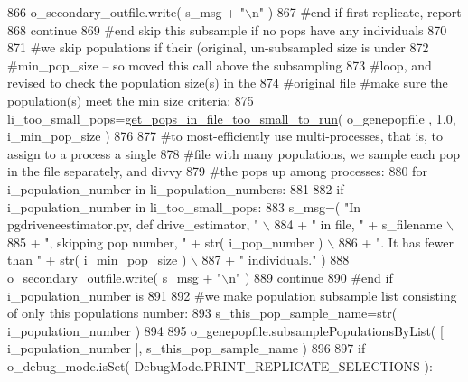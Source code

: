 \begin{DoxyCode}
866                 o\_secondary\_outfile.write( s\_msg + \textcolor{stringliteral}{"\(\backslash\)n"} )
867             \textcolor{comment}{#end if first replicate, report}
868             \textcolor{keywordflow}{continue}
869         \textcolor{comment}{#end skip this subsample if no pops have any individuals}
870 
871         \textcolor{comment}{#we skip populations if their (original, un-subsampled size is under }
872         \textcolor{comment}{#min\_pop\_size -- so moved this call above the subsampling}
873         \textcolor{comment}{#loop, and revised to check the population size(s) in the}
874         \textcolor{comment}{#original file #make sure the population(s) meet the min size criteria:}
875         li\_too\_small\_pops=\hyperlink{namespacenegui_1_1pgdriveneestimator_a8255cfe046e2bbb517ee9834d626c021}{get\_pops\_in\_file\_too\_small\_to\_run}( o\_genepopfile
      , 1.0, i\_min\_pop\_size )
876 
877         \textcolor{comment}{#to most-efficiently use multi-processes, that is, to assign to a process a single}
878         \textcolor{comment}{#file with many populations, we sample each pop in the file separately, and divvy}
879         \textcolor{comment}{#the pops up among processes:}
880         \textcolor{keywordflow}{for} i\_population\_number \textcolor{keywordflow}{in} li\_population\_numbers:
881 
882             \textcolor{keywordflow}{if} i\_population\_number \textcolor{keywordflow}{in} li\_too\_small\_pops:
883                 s\_msg=( \textcolor{stringliteral}{"In pgdriveneestimator.py, def drive\_estimator, "} \(\backslash\)
884                                 + \textcolor{stringliteral}{" in file, "}  + s\_filename \(\backslash\)
885                                 + \textcolor{stringliteral}{", skipping pop number, "}  + str( i\_pop\_number ) \(\backslash\)
886                                 + \textcolor{stringliteral}{".  It has fewer than "} + str( i\_min\_pop\_size ) \(\backslash\)
887                                 + \textcolor{stringliteral}{" individuals."} )
888                 o\_secondary\_outfile.write( s\_msg + \textcolor{stringliteral}{"\(\backslash\)n"} )
889                 \textcolor{keywordflow}{continue}
890             \textcolor{comment}{#end if i\_population\_number is}
891 
892             \textcolor{comment}{#we make population subsample list consisting of only this populations number:}
893             s\_this\_pop\_sample\_name=str( i\_population\_number ) 
894 
895             o\_genepopfile.subsamplePopulationsByList( [ i\_population\_number ], s\_this\_pop\_sample\_name )
896 
897             \textcolor{keywordflow}{if} o\_debug\_mode.isSet( DebugMode.PRINT\_REPLICATE\_SELECTIONS ):

\end{DoxyCode}
